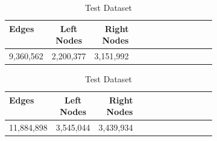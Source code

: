 \begin{table}[!ht]
	\caption{Dataset specification}
	\label{tab:data-set}
	\begin{subtable}{.5\linewidth}
		\caption{Training Dataset}
		\centering
        \begin{tabular}{|l|c|r|m{0.4\linewidth}|}
            \hline
            \textbf{Edges} & \textbf{Left Nodes} & \textbf{Right Nodes} \\
            \hline
            9,360,562 & 2,200,377 & 3,151,992	\\
            \hline
        \end{tabular}
	\end{subtable}%
	\begin{subtable}{.5\linewidth}
		\caption{Test Dataset}
		\centering
        \begin{tabular}{|l|c|r|m{0.4\linewidth}|}
            \hline
            \textbf{Edges} & \textbf{Left Nodes} & \textbf{Right Nodes} \\
            \hline
            11,884,898 & 3,545,044 & 3,439,934	\\
            \hline
        \end{tabular}
	\end{subtable}%
\end{table}
